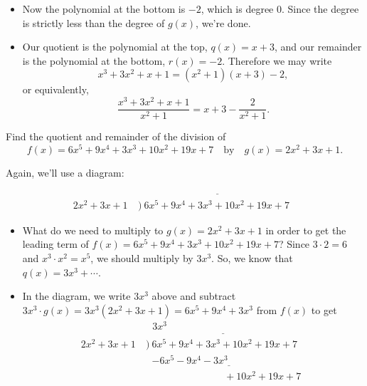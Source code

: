 \documentclass{ximera}
\begin{document}
\begin{example}
\begin{explanation}
\begin{itemize}
    \item Now the polynomial at the bottom is $-2$, which is degree 0. Since the degree is strictly less than the degree of $g(x)$, we're done.
    
    \item Our quotient is the polynomial at the top, $q(x) = x + 3$, and our remainder is the polynomial at the bottom, $r(x) = -2$. Therefore we may write $$   x^3+3x^2+x+1 =(x^2+1)(x+3) - 2, $$or equivalently, $$  \frac{x^3+3x^2+x+1}{x^2+1} = x+3 - \frac{2}{x^2+1}.  $$
    \end{itemize}
  \end{explanation}
\end{example}

\begin{example}
  Find the quotient and remainder of the division of $$f(x) = 6x^5+9x^4+3x^3+10x^2+19x+7\quad\mbox{by}\quad g(x) = 2x^2+3x+1.$$
  
  \begin{explanation}
    Again, we'll use a diagram:
    \begin{align*}
   & \underline{~~~\phantom{3x^3+5}\phantom{somethingssomethingssom}} \\[-4pt]  2x^2+3x+1~&\Big)~6x^5+9x^4+3x^3+10x^2+19x+7 
   \end{align*}
    \begin{itemize}
    \item What do we need to multiply to $g(x) = 2x^2+3x+1$ in order to get the leading term of $f(x) = 6x^5+9x^4+3x^3+10x^2+19x+7$? Since $3 \cdot 2 = 6$ and $x^3 \cdot x^2 = x^5$, we should multiply by $3x^3$. So, we know that $q(x) = 3x^3+\cdots$.
    \item In the diagram, we write $3x^3$ above and subtract $3x^3 \cdot g(x) = 3x^3(2x^2+3x+1) = 6x^5+9x^4+3x^3$ from $f(x)$ to get
    \begin{align*}
   & \underline{~~~3x^3\phantom{+5}\phantom{somethingssomethingssom}} \\[-4pt]  2x^2+3x+1~&\Big)~6x^5+9x^4+3x^3+10x^2+19x+7 \\[-4pt] &\phantom{\big)~} \underline{-6x^5-9x^4-3x^3\phantom{............................}} \\[-4pt] &\phantom{\Big)~}\phantom{..........................}+10x^2+19x+7 
\end{align*}
    

\end{itemize}
\end{explanation}
\end{example}
\end{document}
